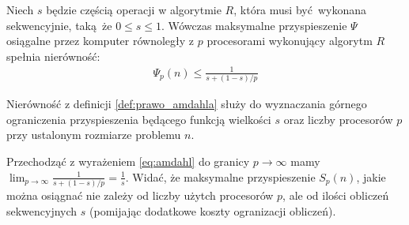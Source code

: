 \begin{definicja}\label{def:prawo_amdahla}
Niech \(s\) będzie częścią operacji w algorytmie \(R\), która musi być wykonana sekwencyjnie, taką że \(0\leq s \leq 1\). Wówczas maksymalne przyspieszenie \(\Psi\) osiągalne przez komputer równoległy z \(p\) procesorami wykonujący algorytm \(R\) spełnia nierówność:
\begin{align}
\Psi_{p}(n) \leq \frac{1}{s+(1-s)/p}
\end{align}
\end{definicja}
\begin{uwaga}
Nierówność z definicji \ref{def:prawo_amdahla} służy do wyznaczania górnego ograniczenia przyspieszenia będącego funkcją wielkości \(s\) oraz liczby procesorów \(p\) przy ustalonym rozmiarze problemu \(n\).
\end{uwaga}
\begin{wniosek}
Przechodząć z wyrażeniem \eqref{eq:amdahl} do granicy \(p\to\infty\) mamy \(\lim_{p\to\infty}\frac{1}{s+(1-s)/p} = \frac{1}{s}\). Widać, że maksymalne przyspieszenie \(S_{p}(n)\), jakie można osiągnać nie zależy od liczby użytch procesorów \(p\), ale od ilości obliczeń sekwencyjnych \(s\) (pomijając dodatkowe koszty ogranizacji obliczeń).
\end{wniosek}

